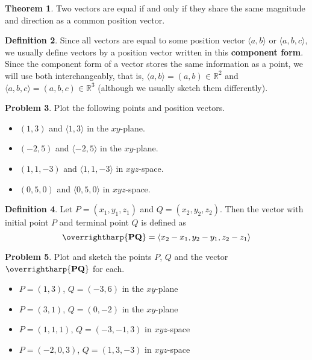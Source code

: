 \documentclass[letterpaper, twoside, 12pt]{book}
\newcommand{\<}{\langle}
\renewcommand{\>}{\rangle}
\theoremstyle{definition}
\newtheorem{theorem}{Theorem}
\theoremstyle{definition}
\newtheorem{definition}[theorem]{Definition}
\newtheorem{problem}[theorem]{Problem}
\newcommand{\harpvec}[1]{\overrightharp{\ensuremath{\mathbf{#1}}}}
\newcommand*{\threevec}[3]{\ensuremath{\left\langle #1, #2, #3 \right\rangle}}
\begin{document}
\begin{theorem}
  Two vectors are equal if and only if they share the same magnitude and
  direction as a common position vector.
\end{theorem}

\begin{definition}
  Since all vectors are equal to some position vector $\<a,b\>$ or $\<a,b,c\>$,
  we usually define vectors by a position vector written in this
  \textbf{component form}.
  Since the component form of a vector stores the same information as a point,
  we will use both interchangeably, that is, $\<a,b\>=(a,b)\in\mathbb{R}^2$ and
  $\<a,b,c\>=(a,b,c)\in\mathbb{R}^3$
  (although we usually sketch them differently).
\end{definition}

\begin{problem}
  Plot the following points and position vectors.
  \begin{itemize}
    \item $(1,3)$ and $\<1,3\>$ in the $xy$-plane.
    \item $(-2,5)$ and $\<-2,5\>$ in the $xy$-plane.
    \item $(1,1,-3)$ and $\<1,1,-3\>$ in $xyz$-space.
    \item $(0,5,0)$ and $\<0,5,0\>$ in $xyz$-space.
  \end{itemize}
\end{problem}

\vfill

\newpage

\begin{definition}
  Let $P = \left(x_1,y_1,z_1\right)$ and $Q = \left(x_2,y_2,z_2\right).$
  Then the vector with initial point $P$ and terminal point $Q$ is defined as
  \[
    \harpvec{PQ} = \threevec{x_2 - x_1}{y_2 - y_1}{z_2 - z_1}
  \]
\end{definition}

\begin{problem}
  Plot and sketch the points $P$, $Q$ and the vector $\harpvec{PQ}$ for each.
  \begin{itemize}
    \item $P=(1,3)$, $Q=(-3,6)$ in the $xy$-plane
    \item $P=(3,1)$, $Q=(0,-2)$ in the $xy$-plane
    \item $P=(1,1,1)$, $Q=(-3,-1,3)$ in $xyz$-space
    \item $P=(-2,0,3)$, $Q=(1,3,-3)$ in $xyz$-space
  \end{itemize}
\end{problem}
\end{document}
